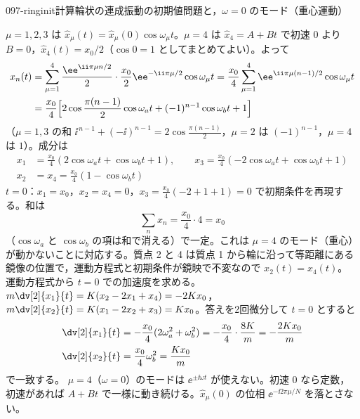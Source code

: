 \documentclass[uplatex,dvipdfmx,a4paper,11pt]{jsarticle}
\begin{document}
\begin{mondai}{097-ringinit}{計算}{輪状の連成振動の初期値問題と，$\omega=0$ のモード（重心運動）}
\begin{tadashii}
 $\mu=1,2,3$ は $\hat{x}_\mu(t)=\hat{x}_\mu(0)\cos\omega_\mu t$。$\mu=4$ は $\hat{x}_4=A+Bt$ で初速 0 より $B=0$，$\hat{x}_4(t)=x_0/2$（$\cos0=1$ としてまとめてよい）。よって
\begin{align*}
  x_n(t)&=\sum_{\mu=1}^{4}\frac{\ee^{\ii\pi\mu n/2}}{2}\cdot\frac{x_0}{2}\ee^{-\ii\pi\mu/2}\cos\omega_\mu t=\frac{x_0}{4}\sum_{\mu=1}^{4}\ee^{\ii\pi\mu(n-1)/2}\cos\omega_\mu t\\
  &=\frac{x_0}{4}\Bigl[2\cos\frac{\pi(n-1)}{2}\cos\omega_at+(-1)^{n-1}\cos\omega_bt+1\Bigr]
\end{align*}
（$\mu=1,3$ の和 $\ii^{\,n-1}+(-\ii)^{n-1}=2\cos\frac{\pi(n-1)}{2}$，$\mu=2$ は $(-1)^{n-1}$，$\mu=4$ は $1$）。成分は
\begin{align*}
  x_1&=\frac{x_0}{4}(2\cos\omega_at+\cos\omega_bt+1),\qquad x_3=\frac{x_0}{4}(-2\cos\omega_at+\cos\omega_bt+1)\\
  x_2&=x_4=\frac{x_0}{4}(1-\cos\omega_bt)
\end{align*}
 $t=0$：$x_1=x_0$，$x_2=x_4=0$，$x_3=\frac{x_0}{4}(-2+1+1)=0$ で初期条件を再現する。和は
\[ \sum_nx_n=\frac{x_0}{4}\cdot4=x_0 \]
（$\cos\omega_a$ と $\cos\omega_b$ の項は和で消える）で一定。これは $\mu=4$ のモード（重心）が動かないことに対応する。質点 2 と 4 は質点 1 から輪に沿って等距離にある鏡像の位置で，運動方程式と初期条件が鏡映で不変なので $x_2(t)=x_4(t)$。
\kenzan 運動方程式から $t=0$ での加速度を求める。$m\dv[2]{x_1}{t}=K(x_2-2x_1+x_4)=-2Kx_0$，$m\dv[2]{x_2}{t}=K(x_1-2x_2+x_3)=Kx_0$。答えを2回微分して $t=0$ とすると
\begin{align*}
  \dv[2]{x_1}{t}&=-\frac{x_0}{4}(2\omega_a^{2}+\omega_b^{2})=-\frac{x_0}{4}\cdot\frac{8K}{m}=-\frac{2Kx_0}{m}\\
  \dv[2]{x_2}{t}&=\frac{x_0}{4}\omega_b^{2}=\frac{Kx_0}{m}
\end{align*}
で一致する。
\tsumazuki $\mu=4$（$\omega=0$）のモードは $\ee^{\pm\ii\omega t}$ が使えない。初速 0 なら定数，初速があれば $A+Bt$ で一様に動き続ける。$\hat{x}_\mu(0)$ の位相 $\ee^{-\ii2\pi\mu/N}$ を落とさない。
\end{tadashii}
\end{mondai}
\end{document}
